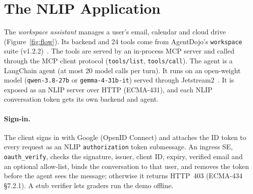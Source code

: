 \section{The NLIP Application}\label{sec:app}

The \emph{workspace assistant} manages a user's email, calendar and cloud drive
(Figure~\ref{fig:flow}). Its backend and 24 tools come from AgentDojo's \texttt{workspace}
suite (v1.2.2)~\cite{agentdojo}. The tools are served by an in-process MCP server and called
through the MCP client protocol (\texttt{tools/list}, \texttt{tools/call}). The agent is a
LangChain agent (at most 20 model calls per turn). It runs on an open-weight model
(\texttt{qwen-3.8-27b} or \texttt{gemma-4-31b-it}) served through Jetstream2~\cite{jetstream2}.
It is exposed as an NLIP server over HTTP (ECMA-431), and each NLIP conversation token
gets its own backend and agent.

\paragraph{Sign-in.} The client signs in with Google (OpenID Connect) and attaches the ID
token to every request as an NLIP \texttt{authorization} token submessage. An ingress SE,
\texttt{oauth\_verify}, checks the signature, issuer, client ID, expiry, verified email and an
optional allow-list, binds the conversation to that user, and removes the token before the
agent sees the message; otherwise it returns HTTP~403 (ECMA-434 \S7.2.1). A stub verifier
lets graders run the demo offline.

